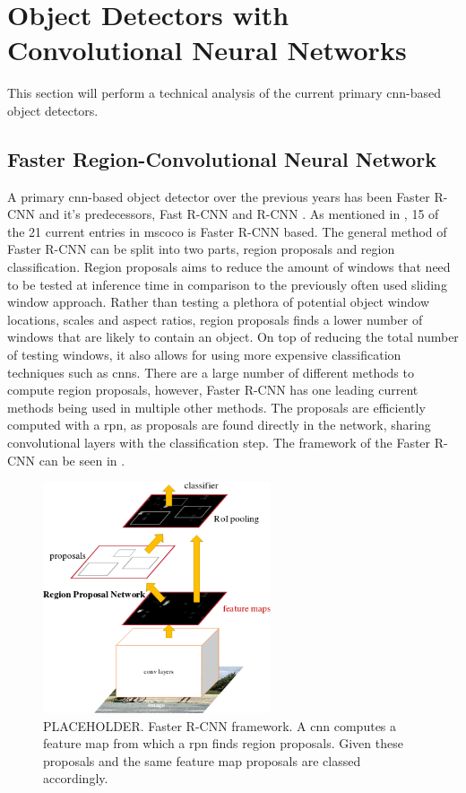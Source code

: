 \section{Object Detectors with Convolutional Neural Networks}\label{sec:objdet}
This section will perform a technical analysis of the current primary \gls{cnn}-based object detectors.

\subsection{Faster Region-Convolutional Neural Network}
A primary \gls{cnn}-based object detector over the previous years has been Faster R-CNN \cite{fasterrcnn} and it's predecessors, Fast R-CNN \cite{fastrcnn} and R-CNN \cite{rcnn}. As mentioned in , 15 of the 21 current entries in \gls{mscoco} is Faster R-CNN based. The general method of Faster R-CNN can be split into two parts, region proposals and region classification. Region proposals aims to reduce the amount of windows that need to be tested at inference time in comparison to the previously often used sliding window approach. Rather than testing a plethora of potential object window locations, scales and aspect ratios, region proposals finds a lower number of windows that are likely to contain an object. On top of reducing the total number of testing windows, it also allows for using more expensive classification techniques such as \glspl{cnn}. There are a large number of different methods to compute region proposals, however, Faster R-CNN has one leading current methods being used in multiple other methods. The proposals are efficiently computed with a \gls{rpn}, as proposals are found directly in the network, sharing convolutional layers with the classification step. The framework of the Faster R-CNN can be seen in . 

\begin{figure}[H]
  \centering
    \includegraphics[width=0.6\textwidth]{Figs/Techanal/fasterframework.png}
      \caption{PLACEHOLDER. Faster R-CNN framework. A \gls{cnn} computes a feature map from which a \gls{rpn} finds region proposals. Given these proposals and the same feature map proposals are classed accordingly.}
    \label{fig:fasterframework}
\end{figure}

